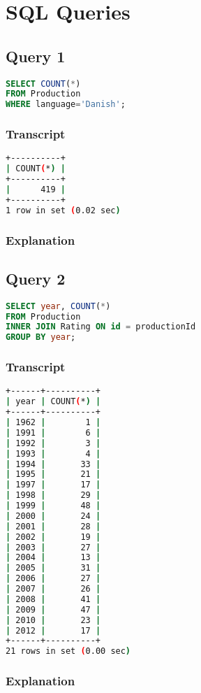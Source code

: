 \section{SQL Queries}
\subsection{Query 1}
\begin{lstlisting}[language=sql]
SELECT COUNT(*)
FROM Production
WHERE language='Danish';
\end{lstlisting}

\subsubsection{Transcript}
\begin{lstlisting}[language=bash]
+----------+
| COUNT(*) |
+----------+
|      419 |
+----------+
1 row in set (0.02 sec)
\end{lstlisting}

\subsubsection{Explanation}


\subsection{Query 2}
\begin{lstlisting}[language=sql]
SELECT year, COUNT(*)
FROM Production
INNER JOIN Rating ON id = productionId
GROUP BY year;
\end{lstlisting}

\subsubsection{Transcript}
\begin{lstlisting}[language=bash]
+------+----------+
| year | COUNT(*) |
+------+----------+
| 1962 |        1 |
| 1991 |        6 |
| 1992 |        3 |
| 1993 |        4 |
| 1994 |       33 |
| 1995 |       21 |
| 1997 |       17 |
| 1998 |       29 |
| 1999 |       48 |
| 2000 |       24 |
| 2001 |       28 |
| 2002 |       19 |
| 2003 |       27 |
| 2004 |       13 |
| 2005 |       31 |
| 2006 |       27 |
| 2007 |       26 |
| 2008 |       41 |
| 2009 |       47 |
| 2010 |       23 |
| 2012 |       17 |
+------+----------+
21 rows in set (0.00 sec)
\end{lstlisting}

\subsubsection{Explanation}



